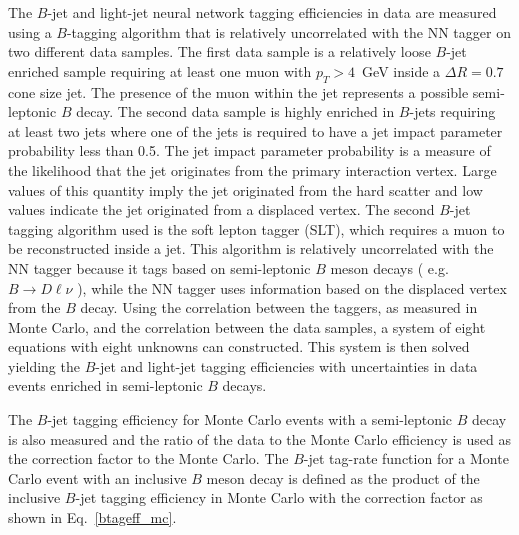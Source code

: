 The $B$-jet and light-jet neural network tagging efficiencies in data are measured using a $B$-tagging algorithm that is relatively uncorrelated with the NN tagger on two different data samples. The first data sample is a relatively loose $B$-jet enriched sample requiring at least one muon with $p_{T}>4$~GeV inside a $\Delta R=0.7$ cone size jet. The presence of the muon within the jet represents a possible semi-leptonic $B$ decay. The second data sample is highly enriched in $B$-jets requiring at least two jets where one of the jets is required to have a jet impact parameter probability less than 0.5. The jet impact parameter probability is a measure of the likelihood that the jet originates from the primary interaction vertex. Large values of this quantity imply the jet originated from the hard scatter and low values indicate the jet originated from a displaced vertex. The second $B$-jet tagging algorithm used is the soft lepton tagger (SLT), which requires a muon to be reconstructed inside a jet. This algorithm is relatively uncorrelated with the NN tagger because it tags based on semi-leptonic $B$ meson decays ( e.g. $B\rightarrow D\ell\nu$ ), while the NN tagger uses information based on the displaced vertex from the $B$ decay. Using the correlation between the taggers, as measured in Monte Carlo, and the correlation between the data samples, a system of eight equations with eight unknowns can constructed. This system is then solved yielding the $B$-jet and light-jet tagging efficiencies with uncertainties in data events enriched in semi-leptonic $B$ decays.



The $B$-jet tagging efficiency for Monte Carlo events with a semi-leptonic $B$ decay is also measured and the ratio of the data to the Monte Carlo efficiency is used as the correction factor to the Monte Carlo. The $B$-jet tag-rate function for a Monte Carlo event with an inclusive $B$ meson decay is defined as the product of the inclusive $B$-jet tagging efficiency in Monte Carlo with the correction factor as shown in Eq.~\ref{btageff_mc}.

